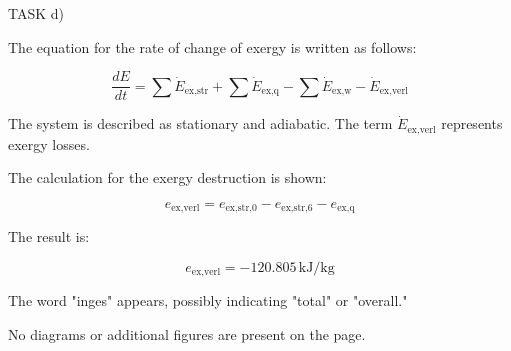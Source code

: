 TASK d)

The equation for the rate of change of exergy is written as follows:

\[
\frac{dE}{dt} = \sum \dot{E}_{\text{ex,str}} + \sum \dot{E}_{\text{ex,q}} - \sum \dot{E}_{\text{ex,w}} - \dot{E}_{\text{ex,verl}}
\]

The system is described as stationary and adiabatic. The term \( \dot{E}_{\text{ex,verl}} \) represents exergy losses. 

The calculation for the exergy destruction is shown:

\[
e_{\text{ex,verl}} = e_{\text{ex,str,0}} - e_{\text{ex,str,6}} - e_{\text{ex,q}}
\]

The result is:

\[
e_{\text{ex,verl}} = -120.805 \, \text{kJ/kg}
\]

The word "inges" appears, possibly indicating "total" or "overall."

No diagrams or additional figures are present on the page.